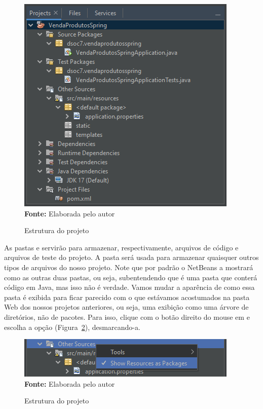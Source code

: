 \FloatBarrier
\begin{figure}[!htbp]
    \centering
    \caption{Estrutura do projeto}
    \includegraphics[scale=1]{imagens/cap10EstruturaProjeto}
    \\\textbf{Fonte:} Elaborada pelo autor
    \label{fig:cap10EstruturaProjeto}
\end{figure}
\FloatBarrier

As pastas  e  servirão para armazenar, respectivamente, arquivos de código e arquivos de teste do projeto. A pasta  será usada para armazenar quaisquer outros tipos de arquivos do nosso projeto. Note que por padrão o NetBeans a mostrará como as outras duas pastas, ou seja, subentendendo que é uma pasta que conterá código em Java, mas isso não é verdade. Vamos mudar a aparência de como essa pasta é exibida para ficar parecido com o que estávamos acostumados na pasta Web dos nossos projetos anteriores, ou seja, uma exibição como uma árvore de diretórios, não de pacotes. Para isso, clique com o botão direito do mouse em  e escolha a opção  (Figura~\ref{fig:cap10ShowResourcesAsPackages}), desmarcando-a. 

\FloatBarrier
\begin{figure}[!htbp]
    \centering
    \caption{Estrutura do projeto}
    \includegraphics[scale=1]{imagens/cap10ShowResourcesAsPackages}
    \\\textbf{Fonte:} Elaborada pelo autor
    \label{fig:cap10ShowResourcesAsPackages}
\end{figure}
\FloatBarrier

